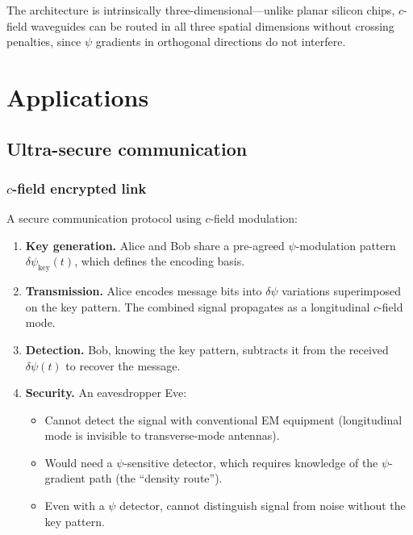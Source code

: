 \documentclass[aps,prd,twocolumn,superscriptaddress,nofootinbib,floatfix]{revtex4-2}
\newcommand{\psifield}{\psi}
\begin{document}
The architecture is intrinsically three-dimensional---unlike planar
silicon chips, $c$-field waveguides can be routed in all three
spatial dimensions without crossing penalties, since $\psifield$
gradients in orthogonal directions do not interfere.

\section{Applications}
\label{sec:applications}

\subsection{Ultra-secure communication}
\label{subsec:secure_comms}

\subsubsection{$c$-field encrypted link}

A secure communication protocol using $c$-field modulation:

\begin{enumerate}
\item \textbf{Key generation.} Alice and Bob share a pre-agreed
$\psifield$-modulation pattern $\delta\psifield_{\text{key}}(t)$,
which defines the encoding basis.

\item \textbf{Transmission.} Alice encodes message bits into
$\delta\psifield$ variations superimposed on the key pattern.
The combined signal propagates as a longitudinal $c$-field mode.

\item \textbf{Detection.} Bob, knowing the key pattern, subtracts
it from the received $\delta\psifield(t)$ to recover the message.

\item \textbf{Security.} An eavesdropper Eve:
\begin{itemize}
\item Cannot detect the signal with conventional EM equipment
(longitudinal mode is invisible to transverse-mode antennas).
\item Would need a $\psifield$-sensitive detector, which requires
knowledge of the $\psifield$-gradient path (the ``density route'').
\item Even with a $\psifield$ detector, cannot distinguish signal
from noise without the key pattern.
\end{itemize}
\end{enumerate}
\end{document}
